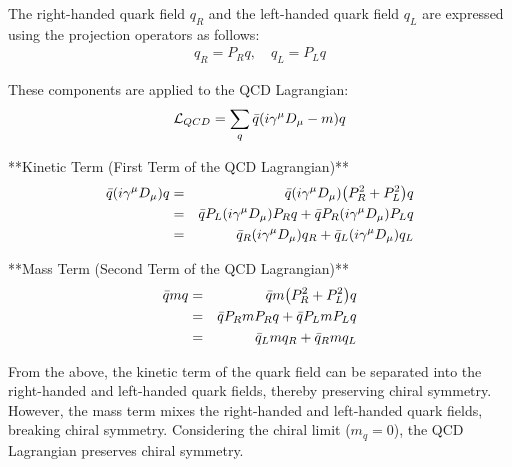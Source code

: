         The right-handed quark field $q_R$ and the left-handed quark field $q_L$ are expressed using the projection operators as follows:  
        \begin{eqnarray}  
            q_R = P_R q, \quad q_L = P_L q
        \end{eqnarray}  
        
        These components are applied to the QCD Lagrangian:  
        \begin{eqnarray}  
            \mathcal{L}_{QCD} = \sum_q \bar{q}\qty(i\gamma^\mu D_\mu - m)q
        \end{eqnarray}  
        
        **Kinetic Term (First Term of the QCD Lagrangian)**  
        \begin{eqnarray}  
            \bar{q}\qty(i\gamma^\mu D_\mu)q &=& \bar{q}\qty(i\gamma^\mu D_\mu)\qty(P_R^2 + P_L^2)q \\  
            &=& \bar{q} P_L \qty(i\gamma^\mu D_\mu) P_R q + \bar{q} P_R \qty(i\gamma^\mu D_\mu) P_L q \\  
            &=& \bar{q}_R \qty(i\gamma^\mu D_\mu) q_R + \bar{q}_L \qty(i\gamma^\mu D_\mu) q_L  
        \end{eqnarray}  
        
        **Mass Term (Second Term of the QCD Lagrangian)**  
        \begin{eqnarray}  
            \bar{q}m q &=& \bar{q} m \qty(P_R^2 + P_L^2)q \\  
            &=& \bar{q} P_R m P_R q + \bar{q} P_L m P_L q \\  
            &=& \bar{q}_L m q_R + \bar{q}_R m q_L
        \end{eqnarray}  
        
        From the above, the kinetic term of the quark field can be separated into the right-handed and left-handed quark fields, thereby preserving chiral symmetry. However, the mass term mixes the right-handed and left-handed quark fields, breaking chiral symmetry. Considering the chiral limit ($m_q = 0$), the QCD Lagrangian preserves chiral symmetry.  
        
